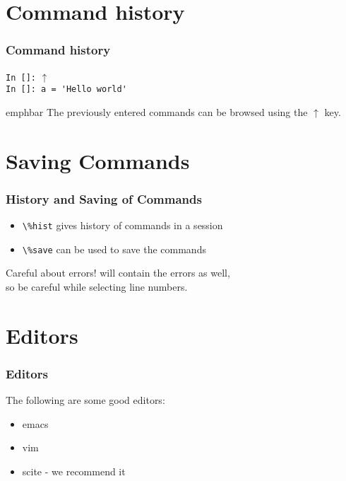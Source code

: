 \documentclass[14pt,compress]{beamer}
\newcommand{\emphbar}[1]
{\begin{beamercolorbox}[rounded=true]{emphbar} 
      {#1}
 \end{beamercolorbox}
}
\newcommand{\typ}[1]{\lstinline{#1}}
\newcommand{\kwrd}[1]{ \texttt{\textbf{\color{blue}{#1}}}  }
\begin{document}
\section{Command history}
\begin{frame}[fragile]
  \frametitle{Command history}
  \typ{In []:} \alert{$\uparrow$}\\
  \typ{In []: a = 'Hello world'}\\
  \emphbar{The previously entered commands can be browsed using the \alert{$\uparrow$} key.}
\end{frame}

\section{Saving Commands}
\begin{frame}[fragile]
\frametitle{History and Saving of Commands}
\begin{itemize}
\item \typ{\%hist} gives history of commands in a session
\item \typ{\%save} can be used to save the commands
\end{itemize}
\begin{block}{Careful about errors!}
  \kwrd{\%hist} will contain the errors as well,\\
  so be careful while selecting line numbers.
\end{block}
\end{frame}

\section{Editors}
\begin{frame}[fragile]
  \frametitle{Editors}
  The following are some good editors:
  \begin{itemize}
  \item emacs
  \item vim
  \item \alert{scite} - we recommend it
  \end{itemize}
\end{frame}
\end{document}
